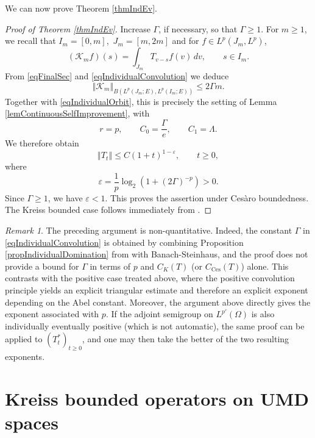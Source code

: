 \documentclass[12pt]{amsart}
\theoremstyle{plain}
\theoremstyle{remark}
\newtheorem{remark}[thm]{Remark}
\theoremstyle{definition}
\newcommand{\norm}[1]{\left\Vert #1\right\Vert}
\begin{document}
	We can now prove Theorem \ref{thmIndEv}.
	
	\begin{proof}[Proof of Theorem \ref{thmIndEv}] Increase $\Gamma$, if necessary, so that $\Gamma\ge1$. For $m\ge1$,
		we recall that $I_m=[0,m]$,\, $J_m=[m,2m]$ and 
		for $f \in L^p(J_m, L^p)$, \[ (\mathcal K_mf)(s) = \int_{J_m}T_{v-s}f(v)\,dv, \qquad s\in I_m. \]
		From \eqref{eqFinalSec} and \eqref{eqIndividualConvolution} we deduce \[ \norm{\mathcal K_m}_{ B(L^p(J_m;E),L^p(I_m;E)) } \le 2\Gamma m. \] Together with \eqref{eqIndividualOrbit}, this is precisely the setting of Lemma \ref{lemContinuousSelfImprovement}, with \[ r=p, \qquad C_0=\frac{\Gamma}{e}, \qquad C_1=\Lambda. \] We therefore obtain \[ \norm{T_t} \le C(1+t)^{1-\varepsilon}, \qquad t\ge0, \] where \[ \varepsilon = \frac1p \log_2 \left( 1+(2\Gamma)^{-p} \right) >0. \] Since $\Gamma\ge1$, we have $\varepsilon<1$. This proves the assertion under Ces\`aro boundedness. The Kreiss bounded case follows immediately from \cite[Proposition 2.6]{ArnoldCoine2023}. \end{proof}
	
	\begin{remark} The preceding argument is non-quantitative. Indeed, the constant $\Gamma$ in \eqref{eqIndividualConvolution} is obtained by combining Proposition \ref{propIndividualDomination} from \cite{ArnoldStability} with
		Banach-Steinhaus, 
		and the proof does not provide a bound for $\Gamma$ in terms of $p$ and $C_K(T)$ (or $C_{\mathrm{Ces}}(T)$) alone. This contrasts with the positive case treated above, where the positive convolution principle yields an explicit triangular estimate and therefore an explicit exponent depending on the Abel constant. Moreover, the argument above directly gives the exponent associated with $p$. If the adjoint semigroup on $L^{p'}(\Omega)$ is also individually eventually positive (which is not automatic), the same proof can be applied to $(T_t^*)_{t\ge0}$, and one may then take the better of the two resulting exponents. \end{remark}
	
	
	
	
	\section{Kreiss bounded operators on UMD spaces}\label{secUMD}
	
\end{document}
